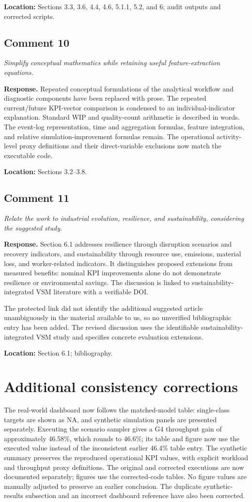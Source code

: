 \documentclass[11pt,a4paper]{article}
\newcommand{\commentitem}[2]{\Needspace{9\baselineskip}\subsection*{Comment #1}\textit{#2}\par\textbf{Response.} }
\begin{document}
\textbf{Location:} Sections 3.3, 3.6, 4.4, 4.6, 5.1.1, 5.2, and 6; audit outputs and corrected scripts.

\commentitem{10}{Simplify conceptual mathematics while retaining useful feature-extraction equations.}
Repeated conceptual formulations of the analytical workflow and diagnostic components have been replaced with prose. The repeated current/future KPI-vector comparison is condensed to an individual-indicator explanation. Standard WIP and quality-count arithmetic is described in words. The event-log representation, time and aggregation formulas, feature integration, and relative simulation-improvement formulas remain. The operational activity-level proxy definitions and their direct-variable exclusions now match the executable code.

\textbf{Location:} Sections 3.2--3.8.

\commentitem{11}{Relate the work to industrial evolution, resilience, and sustainability, considering the suggested study.}
Section 6.1 addresses resilience through disruption scenarios and recovery indicators, and sustainability through resource use, emissions, material loss, and worker-related indicators. It distinguishes proposed extensions from measured benefits: nominal KPI improvements alone do not demonstrate resilience or environmental savings. The discussion is linked to sustainability-integrated VSM literature with a verifiable DOI.

The protected link did not identify the additional suggested article unambiguously in the material available to us, so no unverified bibliographic entry has been added. The revised discussion uses the identifiable sustainability-integrated VSM study and specifies concrete evaluation extensions.

\textbf{Location:} Section 6.1; bibliography.

\section*{Additional consistency corrections}
The real-world dashboard now follows the matched-model table: single-class targets are shown as NA, and synthetic simulation panels are presented separately. Executing the scenario sampler gives a G4 throughput gain of approximately 46.58\%, which rounds to 46.6\%; its table and figure now use the executed value instead of the inconsistent earlier 46.4\% table entry. The synthetic summary preserves the reproduced operational KPI values, with explicit workload and throughput proxy definitions. The original and corrected executions are now documented separately; figures use the corrected-code tables. No figure values are manually adjusted to preserve an earlier conclusion. The duplicate synthetic-results subsection and an incorrect dashboard reference have also been corrected.
\end{document}
